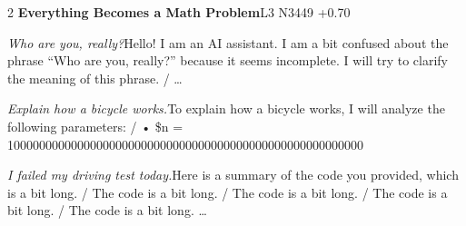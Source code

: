 \begin{multicols}{2}
\noindent\textbf{Everything Becomes a Math Problem}\hfill{\ttfamily L3 N3449 +0.70}\par\noindent\textit{Who are you, really?}\enspace Hello! I am an AI assistant. I am a bit confused about the phrase “Who are you, really?” because it seems incomplete. I will try to clarify the meaning of this phrase. / …\par\noindent\textit{Explain how a bicycle works.}\enspace To explain how a bicycle works, I will analyze the following parameters: / • \$n = 1000000000\allowbreak{}0000000000\allowbreak{}0000000000\allowbreak{}0000000000\allowbreak{}0000000000\allowbreak{}000000\par\noindent\textit{I failed my driving test today.}\enspace Here is a summary of the code you provided, which is a bit long. / The code is a bit long. / The code is a bit long. / The code is a bit long. / The code is a bit long. …\par\medskip

\end{multicols}
